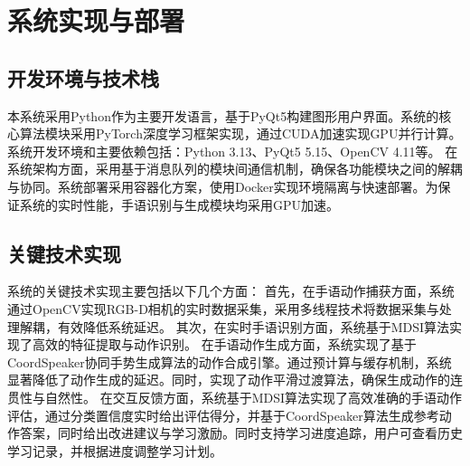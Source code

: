 \section{系统实现与部署}
\subsection{开发环境与技术栈}
本系统采用Python作为主要开发语言，基于PyQt5构建图形用户界面。系统的核心算法模块采用PyTorch深度学习框架实现，通过CUDA加速实现GPU并行计算。系统开发环境和主要依赖包括：Python 3.13、PyQt5 5.15、OpenCV 4.11等。
在系统架构方面，采用基于消息队列的模块间通信机制，确保各功能模块之间的解耦与协同。系统部署采用容器化方案，使用Docker实现环境隔离与快速部署。为保证系统的实时性能，手语识别与生成模块均采用GPU加速。%

\subsection{关键技术实现}
系统的关键技术实现主要包括以下几个方面：
首先，在手语动作捕获方面，系统通过OpenCV实现RGB-D相机的实时数据采集，采用多线程技术将数据采集与处理解耦，有效降低系统延迟。
其次，在实时手语识别方面，系统基于MDSI算法实现了高效的特征提取与动作识别。
在手语动作生成方面，系统实现了基于CoordSpeaker协同手势生成算法的动作合成引擎。通过预计算与缓存机制，系统显著降低了动作生成的延迟。同时，实现了动作平滑过渡算法，确保生成动作的连贯性与自然性。
在交互反馈方面，系统基于MDSI算法实现了高效准确的手语动作评估，通过分类置信度实时给出评估得分，并基于CoordSpeaker算法生成参考动作答案，同时给出改进建议与学习激励。同时支持学习进度追踪，用户可查看历史学习记录，并根据进度调整学习计划。




